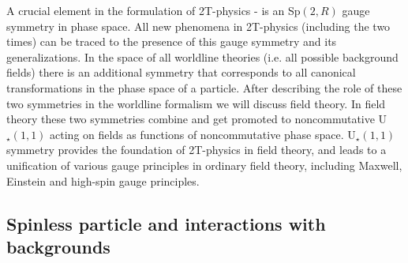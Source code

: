 \documentclass[a4paper,12pt]{article}
\begin{document}
A crucial element in the formulation of 2T-physics \cite{survey2T}-\cite
{NCu11} is an Sp$\left( 2,R\right) $ gauge symmetry in phase space. All new
phenomena in 2T-physics (including the two times) can be traced to the
presence of this gauge symmetry and its generalizations. In the space of all
worldline theories (i.e. all possible background fields) there is an
additional symmetry that corresponds to all canonical transformations in the
phase space of a particle. After describing the role of these two symmetries
in the worldline formalism we will discuss field theory. In field theory
these two symmetries combine and get promoted to noncommutative U$_{\star
}\left( 1,1\right) $ acting on fields as functions of noncommutative phase
space. U$_{\star }\left( 1,1\right) $ symmetry provides the foundation of
2T-physics in field theory, and leads to a unification of various gauge
principles in ordinary field theory, including Maxwell, Einstein and
high-spin gauge principles.

\subsection{Spinless particle and interactions with backgrounds}
\end{document}
